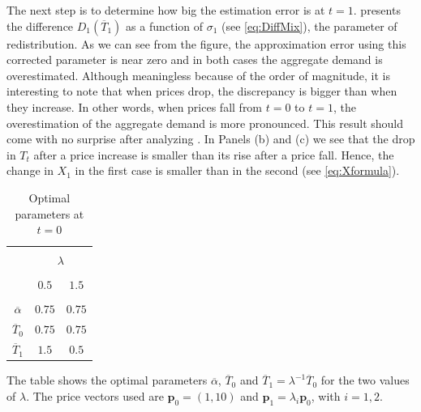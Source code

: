 \documentclass[english, a4paper, 12pt]{article}
\begin{document}
The next step is to determine how big the estimation error is at $t = 1$.  presents the difference $D_{1}(\overline{T}_{1})$ as a function of $\sigma_{1}$ (see \eqref{eq:DiffMix}), the parameter of redistribution. As we can see from the figure, the approximation error using this corrected parameter is near zero and in both cases the aggregate demand is overestimated. Although meaningless because of the order of magnitude, it is interesting to note that when prices drop, the discrepancy is bigger than when they increase. In other words, when prices fall from $t=0$ to $t = 1$, the overestimation of the aggregate demand is more pronounced. This result should come with no surprise after analyzing . In Panels (b) and (c) we see that the drop in $T_{t}$ after a price increase is smaller than its rise after a price fall. Hence, the change in $X_{1}$ in the first case is smaller than in the second (see \eqref{eq:Xformula}). 
	\begin{table}[H]
		\centering
		\caption{Optimal parameters at $t = 0$}
		\label{tab:OptimalAlphaT}
		\begin{tabular}{ccc}
		\hline\hline
														\\[-2ex]
							&	\multicolumn{2}{c}{$\lambda$}	\\\cline{2-3}
														\\[-2ex]
							&	$0.5$		&	$1.5$	\\ \hline
														\\[-2ex]
			$\overline{\alpha}$	&	$0.75$		&	$0.75$	\\[1ex]
			$\overline{T}_{0}$	&	$0.75$		&	$0.75$	\\[1ex]
			$\overline{T}_{1}$	&	$1.5$		&	$0.5$	\\[.5ex]
		\hline\hline
		\end{tabular} \vspace{2ex}
		
		\begin{minipage}{0.3\textwidth} \scriptsize
			The table shows the optimal parameters $\overline{\alpha}$, $\overline{T}_{0}$ and $\overline{T}_{1} = \lambda^{-1} \overline{T}_{0}$ for the two values of $\lambda$. The price vectors used are $\mathbf{p}_{0} = (1,10)$ and $\mathbf{p}_{1} = \lambda_{i} \mathbf{p}_{0}$, with $i = 1,2$.
		\end{minipage}
	\end{table}
\end{document}
